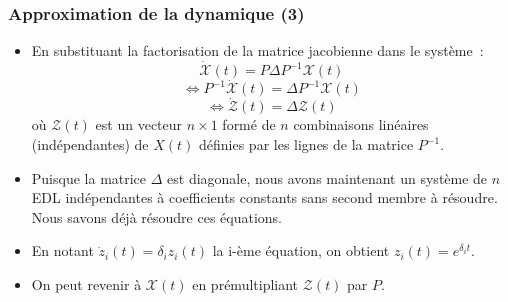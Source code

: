 \documentclass[10pt,notheorems]{beamer}
\theoremstyle{plain}
\theoremstyle{definition} %
\begin{document}
\begin{frame}
  \frametitle{Approximation de la dynamique (3)}

  \begin{itemize}

  \item En substituant la factorisation de la matrice jacobienne dans le système~:
    \[
      \dot{\mathcal X}(t) = P \Delta P^{-1} \mathcal X (t)
    \]
    \[
      \Leftrightarrow P^{-1}\dot{\mathcal X}(t) = \Delta P^{-1} \mathcal X (t)
    \]
    \[
      \Leftrightarrow \dot{\mathcal Z}(t) = \Delta \mathcal Z (t)
    \]
    où $\mathcal Z(t)$ est un vecteur $n\times 1$ formé de $n$ combinaisons linéaires (indépendantes) de  $X(t)$ définies par les lignes de la matrice $P^{-1}$.\newline

  \item Puisque la matrice $\Delta$ est diagonale, nous avons maintenant un système de $n$ EDL indépendantes à coefficients constants sans second membre à résoudre. Nous savons déjà résoudre ces équations.\newline

  \item En notant $\dot z_i(t) = \delta_i z_i(t)$ la i-ème équation, on obtient $z_i(t) = e^{\delta_i t}$.\newline

  \item On peut revenir à $\mathcal X(t)$ en prémultipliant $\mathcal Z(t)$ par $P$.

  \end{itemize}
\end{frame}
\end{document}
